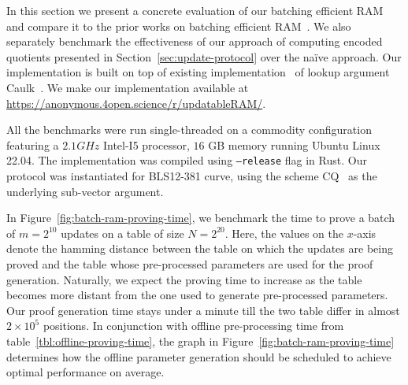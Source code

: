 In this section we present a concrete evaluation of our batching efficient RAM and compare it to the
prior works on batching efficient RAM~\cite{USENIX:OWWB20,CCS:CFHKKO22}.
We also separately benchmark the effectiveness of our approach of computing encoded quotients presented
in Section~\ref{sec:update-protocol} over the na\"{i}ve approach.
Our implementation is built on top of existing implementation~\cite{caulk-implementation}
of lookup argument Caulk~\cite{CCS:ZBKMNS22}. We make our implementation available at
\url{https://anonymous.4open.science/r/updatableRAM/}. 

\smallskip

 All the benchmarks were run single-threaded on a commodity configuration featuring a
$2.1GHz$ Intel-I5 processor, $16$ GB memory running Ubuntu Linux 22.04. The implementation was compiled using {\tt --release}
flag in Rust. Our protocol was instantiated for BLS12-381 curve, using the scheme CQ~\cite{EPRINT:EagFioGab22}
as the underlying sub-vector argument.

\smallskip

 In Figure~\ref{fig:batch-ram-proving-time}, we benchmark the time
to prove a batch of $m=2^{10}$ updates on a table of size $N=2^{20}$. Here, the values on the $x$-axis denote
the hamming distance between the table on which the updates are being proved and the table whose pre-processed
parameters are used for the proof generation. Naturally, we expect the proving time to increase as the table
becomes more distant from the one used to generate pre-processed parameters. Our proof generation time stays
under a minute till the two table differ in almost $2\times 10^5$ positions. In conjunction with offline
pre-processing time from table~\ref{tbl:offline-proving-time}, the graph in Figure~\ref{fig:batch-ram-proving-time}
determines how the offline parameter generation should be scheduled to achieve optimal performance on average.

